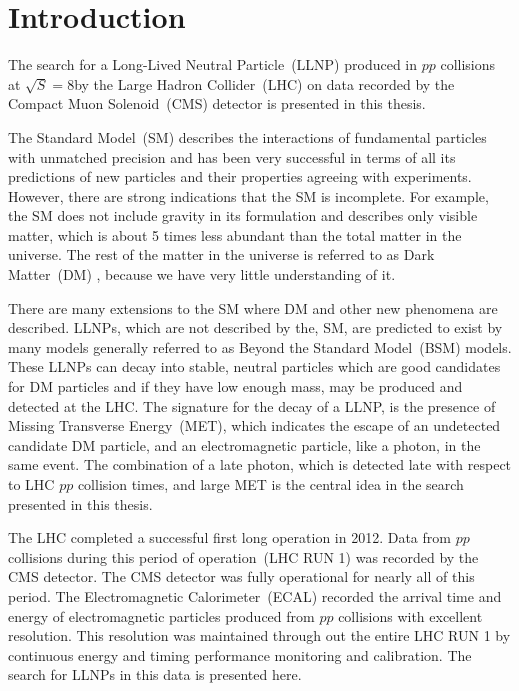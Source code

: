 \chapter{Introduction}
\par %
The search for a Long-Lived Neutral Particle~(LLNP) produced in $pp$ collisions at $\sqrt{S} = 8$\TeV by the Large Hadron Collider~(LHC) on data recorded by the Compact Muon Solenoid~(CMS) detector is presented in this thesis.
\par
The Standard Model~(SM) describes the interactions of fundamental particles with unmatched precision and has been very successful in terms of all its predictions of new particles and their properties  agreeing with experiments. However, there are strong indications that the SM is incomplete. For example, the SM does not include gravity in its formulation and describes only visible matter, which is
about 5 times less abundant than the total matter in the universe. The rest of the matter in the universe is referred to as Dark Matter~(DM) \cite{DM,SUSYDM,LSPDM}, because we have very little understanding of it.
\par
There are many extensions to the SM where DM and other new phenomena are described. LLNPs, which are not described by the, SM, are predicted to exist by many models generally referred to as Beyond the Standard Model~(BSM) models. These LLNPs can decay into stable, neutral particles which are good candidates for DM particles and if they have low enough mass, may be produced and detected at the LHC. The signature for the decay of a LLNP, is the presence of Missing Transverse Energy~(MET), which indicates the escape of an undetected candidate DM particle, and an electromagnetic particle, like a photon, in the same event. The combination of a late photon, which is detected late with respect to LHC $pp$ collision times, and large MET is the central idea in the search presented in this thesis.
\par
The LHC completed a successful first long operation in 2012. Data from $pp$ collisions during this period of operation~(LHC RUN 1) was recorded by the CMS detector. The CMS detector was fully operational for nearly all of this period. The Electromagnetic Calorimeter~(ECAL) recorded the arrival time and energy of electromagnetic particles produced from $pp$ collisions with excellent resolution. This resolution was maintained through out the entire LHC RUN 1 by continuous energy and timing performance monitoring and calibration. The search for LLNPs in this data is presented here.
